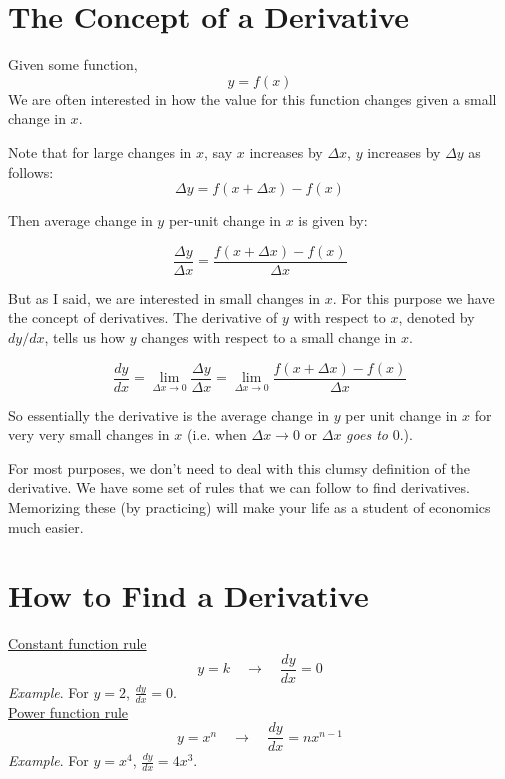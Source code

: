 \documentclass{./../../Latex/handout}
\begin{document}
\thispagestyle{plain}

\section{The Concept of a Derivative}

Given some function, 
$$ y = f(x) $$
We are often interested in how the value for this function changes given a small change in $x$. 

Note that for large changes in $x$, say $x$ increases by $\Delta x$, $y$ increases by $\Delta y$ as follows:
$$ \Delta y =  f(x+\Delta x) - f(x) $$

Then average change in $y$ per-unit change in $x$ is given by:

$$ \frac{\Delta y}{\Delta x} =  \frac{f(x+\Delta x) - f(x)}{\Delta x} $$

But as I said, we are interested in small changes in $x$. For this purpose we have the concept of derivatives. The derivative of $y$ with respect to $x$, denoted by $d y/ d x$, tells us how $y$ changes with respect to a small change in $x$. 

$$  \frac{d y}{d x}= \lim_{\Delta x \rightarrow 0}  \frac{\Delta y}{\Delta x} =  \lim_{\Delta x \rightarrow 0}  \frac{f(x+\Delta x) - f(x)}{\Delta x} $$

So essentially the derivative is the average change in $y$ per unit change in $x$ for very very small changes in $x$ (i.e. when $\Delta x \rightarrow 0$ or $\Delta x$ \textit{goes to} 0.). 

For most purposes, we don't need to deal with this clumsy definition of the derivative. We have some set of rules that we can follow to find derivatives. Memorizing these (by practicing) will make your life as a student of economics much easier. 

\section{How to Find a Derivative}

\underline{Constant function rule}
$$ y=k \quad \rightarrow \quad \frac{d y}{d x}=0 $$
\textit{\textit{Example}}. For $y=2$, $\frac{d y}{d x}=0 $. \\

\underline{Power function rule}
$$ y=x^{n} \quad \rightarrow \quad \frac{d y}{d x}=n x^{n-1} $$
\textit{\textit{Example}}. For $y=x^{4}$, $ \frac{d y}{d x}=4 x^3 $.\\
\end{document}
